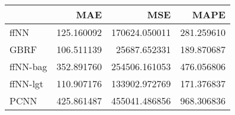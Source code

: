 \begin{tabular}{lrrr}
\toprule
{} &         MAE &            MSE &        MAPE \\
\midrule
ffNN     &  125.160092 &  170624.050011 &  281.259610 \\
GBRF     &  106.511139 &   25687.652331 &  189.870687 \\
ffNN-bag &  352.891760 &  254506.161053 &  476.056806 \\
ffNN-lgt &  110.907176 &  133902.972769 &  171.376837 \\
PCNN     &  425.861487 &  455041.486856 &  968.306836 \\
\bottomrule
\end{tabular}
